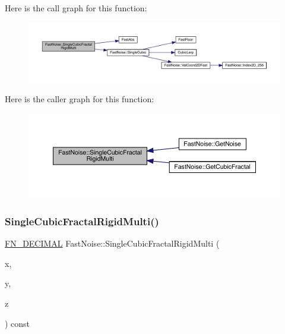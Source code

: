 Here is the call graph for this function\+:
\nopagebreak
\begin{figure}[H]
\begin{center}
\leavevmode
\includegraphics[width=350pt]{class_fast_noise_ae8f66a142a0206d4907a5dab291f4b3d_cgraph}
\end{center}
\end{figure}
Here is the caller graph for this function\+:
\nopagebreak
\begin{figure}[H]
\begin{center}
\leavevmode
\includegraphics[width=350pt]{class_fast_noise_ae8f66a142a0206d4907a5dab291f4b3d_icgraph}
\end{center}
\end{figure}
\mbox{\label{class_fast_noise_ab460847f52a3b64ac6ebbda5538c9c9a}} 
\subsubsection{\texorpdfstring{Single\+Cubic\+Fractal\+Rigid\+Multi()}{SingleCubicFractalRigidMulti()}\hspace{0.1cm}{\footnotesize\ttfamily [2/2]}}
{\footnotesize\ttfamily \mbox{\hyperlink{_fast_noise_8h_a75a9ef6d2541c4921815b885bfd449c3}{F\+N\+\_\+\+D\+E\+C\+I\+M\+AL}} Fast\+Noise\+::\+Single\+Cubic\+Fractal\+Rigid\+Multi (\begin{DoxyParamCaption}\item[{\mbox{\hyperlink{_fast_noise_8h_a75a9ef6d2541c4921815b885bfd449c3}{F\+N\+\_\+\+D\+E\+C\+I\+M\+AL}}}]{x,  }\item[{\mbox{\hyperlink{_fast_noise_8h_a75a9ef6d2541c4921815b885bfd449c3}{F\+N\+\_\+\+D\+E\+C\+I\+M\+AL}}}]{y,  }\item[{\mbox{\hyperlink{_fast_noise_8h_a75a9ef6d2541c4921815b885bfd449c3}{F\+N\+\_\+\+D\+E\+C\+I\+M\+AL}}}]{z }\end{DoxyParamCaption}) const\hspace{0.3cm}{\ttfamily [private]}}

